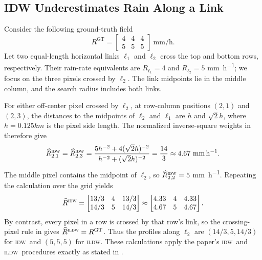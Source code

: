 \documentclass[a4paper,fleqn]{cas-sc}
\DeclareRobustCommand{\IDW}{\textsc{idw}}
\DeclareRobustCommand{\ILDW}{\textsc{ildw}}
\begin{document}
\subsection{IDW Underestimates Rain Along a Link}
\label{appendix:IDW underestimate}
Consider the following ground-truth field
\[
R^{\mathrm{GT}}=
\begin{bmatrix}
4&4&4\\
5&5&5
\end{bmatrix}\ \si{\milli\meter\per\hour}.
\]
Let two equal-length horizontal links $\ell_1$ and $\ell_2$ cross the top and
bottom rows, respectively.  Their rain-rate equivalents are
$R_{\ell_1}=4$ and $R_{\ell_2}=5$
\si{\milli\meter\per\hour}; we focus on the three pixels crossed by
$\ell_2$.  The link midpoints lie in the middle column, and the search radius
includes both links.

For either off-center pixel crossed by $\ell_2$, at row-column positions
$(2,1)$ and $(2,3)$, the distances to the midpoints of $\ell_2$ and $\ell_1$
are $h$ and $\sqrt{2}h$, where $h = 0.125km$ is the pixel side length.  The normalized inverse-square
weights in  therefore give
\[
\widehat R^{\IDW}_{2,1}=\widehat R^{\IDW}_{2,3}
=\frac{5h^{-2}+4(\sqrt{2}h)^{-2}}
       {h^{-2}+(\sqrt{2}h)^{-2}}
=\frac{14}{3}\approx4.67\ \si{\milli\meter\per\hour}.
\]
The middle pixel contains the midpoint of $\ell_2$, so
$\widehat R^{\IDW}_{2,2}=5$ \si{\milli\meter\per\hour}.  Repeating the
calculation over the grid yields
\[
\widehat R^{\IDW}=\begin{bmatrix}
13/3&4&13/3\\
14/3&5&14/3
\end{bmatrix}
\approx\begin{bmatrix}
4.33&4&4.33\\
4.67&5&4.67
\end{bmatrix}.
\]
By contrast, every pixel in a row is crossed by that row's link, so the
crossing-pixel rule in  gives
$\widehat R^{\ILDW}=R^{\mathrm{GT}}$.  Thus the profiles along $\ell_2$ are
$(14/3,5,14/3)$ for \IDW\ and $(5,5,5)$ for \ILDW.  These calculations apply
the paper's \IDW\ and
\ILDW\ procedures exactly as stated in .
\end{document}
